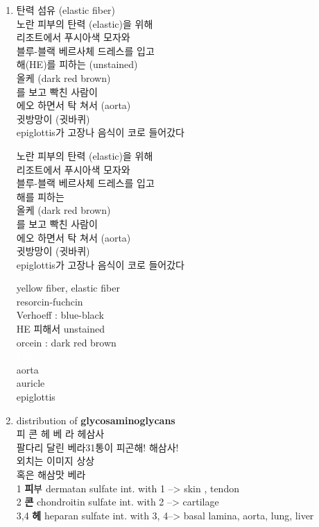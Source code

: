 \documentclass[10pt]{amsart}
\numberwithin{theorem}{section}
\numberwithin{example}{section}
\theoremstyle{definition}
\theoremstyle{remark}
\begin{document}
\begin{enumerate}
    \item  
   탄력 섬유 (elastic fiber)  \\
   노란 피부의 탄력 (elastic)을 위해\\
    리조트에서 푸시아색 모자와\\ 
블루-블랙  베르사체 드레스를 입고\\
해(HE)를 피하는 (unstained) \\
올케 (dark red brown)\\ 
를 보고 빡친 사람이 \\
에오 하면서 탁 쳐서 (aorta)\\
귓방망이 (귓바퀴) \\
epiglottis가 고장나 음식이 코로 들어갔다\\



\begin{minipage}[t]{0.4\textwidth}
노란 피부의 탄력 (elastic)을 위해\\
    리조트에서 푸시아색 모자와\\ 
블루-블랙  베르사체 드레스를 입고\\
해를 피하는 \\
올케 (dark red brown)\\ 
를 보고 빡친 사람이 \\
에오 하면서 탁 쳐서 (aorta)\\
귓방망이 (귓바퀴) \\
epiglottis가 고장나 음식이 코로 들어갔다\\
\end{minipage}%
\hfill
\vrule
\hfill
\begin{minipage}[t]{0.4\textwidth}
yellow fiber, elastic fiber\\
resorcin-fuchcin\\
Verhoeff : blue-black\\
HE 피해서 unstained \\
orcein : dark red brown \\
\textcolor{white}{123} \\
aorta \\
auricle \\
epiglottis
\end{minipage}


    \item distribution of \textbf{glycosaminoglycans} \\ 
     피 콘 헤        베 라   헤삼사  \\  
팔다리 달린 베라31통이 피곤해! 해삼사!  \\
 외치는 이미지 상상 \\
혹은 해삼맛 베라  \\ 
1 \textbf{피}부 dermatan sulfate  int. with 1 --> skin , tendon \\  
2 \textbf{콘} chondroitin sulfate int. with 2 --> cartilage  \\ 
3,4 \textbf{헤} heparan sulfate int. with 3, 4--> basal lamina, aorta, lung, liver \\ 



\end{enumerate}
\end{document}
